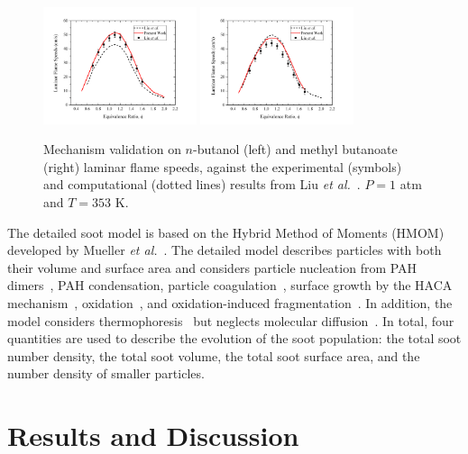 \documentclass[review,3p,times]{elsarticleUS}
\begin{document}
\begin{figure}[ht]
  \centering
  \scriptsize
  \includegraphics[trim=4mm 8mm 30mm 20mm, clip=true, width=0.4\textwidth]{NB.png}
  \includegraphics[trim=4mm 8mm 30mm 20mm, clip=true, width=0.4\textwidth]{MB.png}
  \normalsize
  \vspace{-0.1in}
  \caption{Mechanism validation on $n$-butanol (left) and methyl butanoate (right) laminar flame speeds, against the experimental (symbols) and computational (dotted lines) results from Liu \emph{et al.}~\cite{liu11}. $P=1$ atm and $T=353$ K.}
  \label{fig:validation}
\end{figure}

The detailed soot model is based on the Hybrid Method of Moments (HMOM) developed by Mueller \emph{et al.}~\cite{mueller09a,mueller09b,mueller11a}. The detailed model describes particles with both their volume and surface area and considers particle nucleation from PAH dimers~\cite{schuetz02,wong09,blanquart09c}, PAH condensation, particle coagulation~\cite{mueller09b}, surface growth by the HACA mechanism~\cite{frenklach91}, oxidation~\cite{kazakov95,neoh81}, and oxidation-induced fragmentation~\cite{mueller11a}. In addition, the model considers thermophoresis~\cite{waldmann66} but neglects molecular diffusion~\cite{bisetti12}. In total, four quantities are used to describe the evolution of the soot population: the total soot number density, the total soot volume, the total soot surface area, and the number density of smaller particles.

\section{Results and Discussion}
\end{document}
